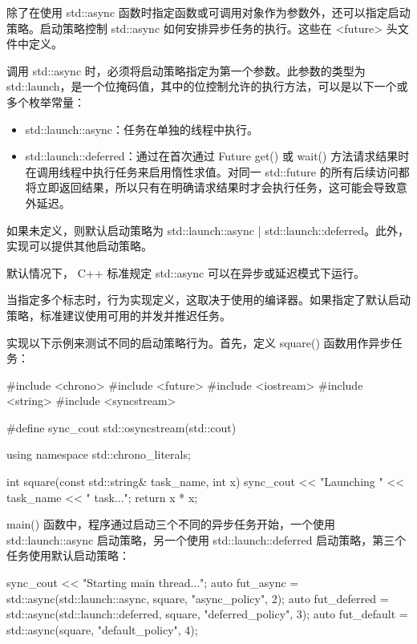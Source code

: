 除了在使用 std::async 函数时指定函数或可调用对象作为参数外，还可以指定启动策略。启动策略控制 std::async 如何安排异步任务的执行。这些在 <future> 头文件中定义。

调用 std::async 时，必须将启动策略指定为第一个参数。此参数的类型为 std::launch，是一个位掩码值，其中的位控制允许的执行方法，可以是以下一个或多个枚举常量：

\begin{itemize}
\item
std::launch::async：任务在单独的线程中执行。

\item
std::launch::deferred：通过在首次通过 Future get() 或 wait() 方法请求结果时在调用线程中执行任务来启用惰性求值。对同一 std::future 的所有后续访问都将立即返回结果，所以只有在明确请求结果时才会执行任务，这可能会导致意外延迟。
\end{itemize}

如果未定义，则默认启动策略为 std::launch::async | std::launch::deferred。此外，实现可以提供其他启动策略。

默认情况下， C++ 标准规定 std::async 可以在异步或延迟模式下运行。

当指定多个标志时，行为实现定义，这取决于使用的编译器。如果指定了默认启动策略，标准建议使用可用的并发并推迟任务。

实现以下示例来测试不同的启动策略行为。首先，定义 square() 函数用作异步任务：

\begin{cpp}
#include <chrono>
#include <future>
#include <iostream>
#include <string>
#include <syncstream>

#define sync_cout std::osyncstream(std::cout)

using namespace std::chrono_literals;

int square(const std::string& task_name, int x) {
    sync_cout << "Launching " << task_name
              << " task...\n";
    return x * x;
}
\end{cpp}

main() 函数中，程序通过启动三个不同的异步任务开始，一个使用 std::launch::async 启动策略，另一个使用 std::launch::deferred 启动策略，第三个任务使用默认启动策略：

\begin{cpp}
sync_cout << "Starting main thread...\n";
auto fut_async = std::async(std::launch::async,
                        square, "async_policy", 2);
auto fut_deferred = std::async(std::launch::deferred,
                        square, "deferred_policy", 3);
auto fut_default = std::async(square,
                        "default_policy", 4);
\end{cpp}

